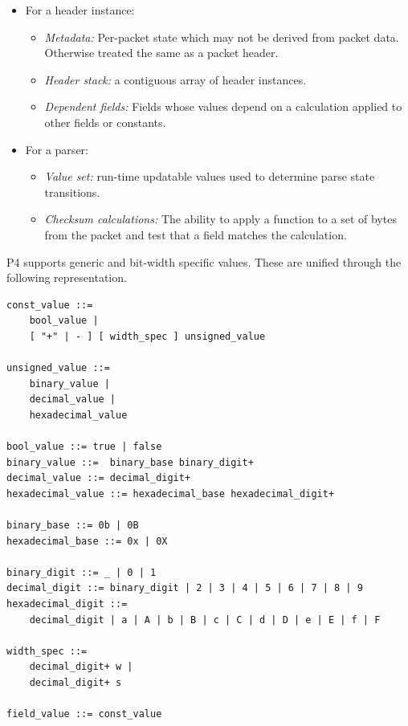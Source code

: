 \documentclass[12pt]{article}
\begin{document}
\begin{itemize}

\item
For a header instance:
\begin{itemize}
\item
\textit{Metadata:} Per-packet state which may not be derived from
packet data. Otherwise treated the same as a packet header.
\item
\textit{Header stack:} a contiguous array of header instances.
\item
\textit{Dependent fields:} Fields whose values depend on a calculation
applied to other fields or constants.
\end{itemize}

\item
For a parser:
\begin{itemize}
\item
\textit{Value set:} run-time updatable values used to determine parse
state transitions.
\item
\textit{Checksum calculations:} The ability to apply a function to a
set of bytes from the packet and test that a field matches the
calculation.
\end{itemize}

\end{itemize}



P4 supports generic and bit-width specific values. These are unified through
the following representation.

\begin{lstlisting}[style=BNFstyle]
const_value ::=
    bool_value |
    [ "+" | - ] [ width_spec ] unsigned_value

unsigned_value ::= 
    binary_value | 
    decimal_value | 
    hexadecimal_value

bool_value ::= true | false
binary_value ::=  binary_base binary_digit+
decimal_value ::= decimal_digit+
hexadecimal_value ::= hexadecimal_base hexadecimal_digit+

binary_base ::= 0b | 0B
hexadecimal_base ::= 0x | 0X

binary_digit ::= _ | 0 | 1
decimal_digit ::= binary_digit | 2 | 3 | 4 | 5 | 6 | 7 | 8 | 9
hexadecimal_digit ::= 
    decimal_digit | a | A | b | B | c | C | d | D | e | E | f | F

width_spec ::=
    decimal_digit+ w |
    decimal_digit+ s

field_value ::= const_value
\end{lstlisting}
\end{document}
